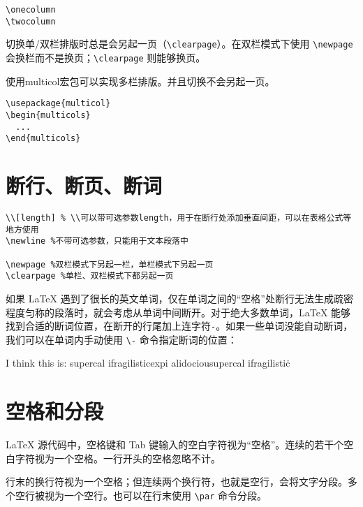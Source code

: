 \begin{lstlisting}
\onecolumn
\twocolumn
\end{lstlisting}

切换单/双栏排版时总是会另起一页（\lstinline{\clearpage}）。在双栏模式下使用 \lstinline{\newpage} 会换栏而不是换页；\lstinline{\clearpage} 则能够换页。

使用multicol宏包可以实现多栏排版。并且切换不会另起一页。

\begin{lstlisting}
\usepackage{multicol}
\begin{multicols}{2}
  ...
\end{multicols}
\end{lstlisting}

\section{断行、断页、断词}\label{sec:break}

\begin{lstlisting}
\\[length] % \\可以带可选参数length，用于在断行处添加垂直间距，可以在表格公式等地方使用
\newline %不带可选参数，只能用于文本段落中

\newpage %双栏模式下另起一栏，单栏模式下另起一页
\clearpage %单栏、双栏模式下都另起一页
\end{lstlisting}

如果 \LaTeX{} 遇到了很长的英文单词，仅在单词之间的“空格”处断行无法生成疏密程度匀称的段落时，就会考虑从单词中间断开。对于绝大多数单词，\LaTeX{} 能够找到合适的断词位置，在断开的行尾加上连字符\lstinline{-}。如果一些单词没能自动断词，我们可以在单词内手动使用 \lstinline{\-} 命令指定断词的位置：

\begin{codeshow}
  I think this is: su\-per\-cal\-%
  i\-frag\-i\-lis\-tic\-ex\-pi\-%
  al\-i\-do\-ciousu\-per\-cal\-%
  i\-frag\-i\-lis\-tic\.
\end{codeshow}

\section{空格和分段}\label{sec:space}
\LaTeX{} 源代码中，空格键和 Tab 键输入的空白字符视为“空格”。连续的若干个空白字符视为一个空格。一行开头的空格忽略不计。

行末的换行符视为一个空格；但连续两个换行符，也就是空行，会将文字分段。多个空行被视为一个空行。也可以在行末使用 \lstinline{\par} 命令分段。

